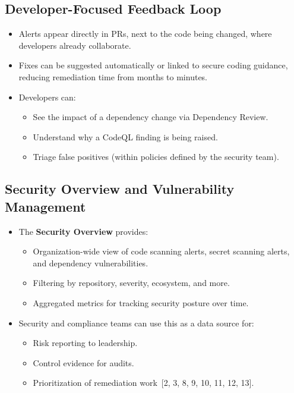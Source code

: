 \documentclass[11pt]{article}
\begin{document}
\subsection{Developer-Focused Feedback Loop}

\begin{itemize}[leftmargin=*]
  \item Alerts appear directly in PRs, next to the code being changed, where developers already collaborate.
  \item Fixes can be suggested automatically or linked to secure coding guidance, reducing remediation time from months to minutes.
  \item Developers can:
    \begin{itemize}
      \item See the impact of a dependency change via Dependency Review.
      \item Understand why a CodeQL finding is being raised.
      \item Triage false positives (within policies defined by the security team).
    \end{itemize}
\end{itemize}

\subsection{Security Overview and Vulnerability Management}

\begin{itemize}[leftmargin=*]
  \item The \textbf{Security Overview} provides:
    \begin{itemize}
      \item Organization-wide view of code scanning alerts, secret scanning alerts, and dependency vulnerabilities.
      \item Filtering by repository, severity, ecosystem, and more.
      \item Aggregated metrics for tracking security posture over time.
    \end{itemize}
  \item Security and compliance teams can use this as a data source for:
    \begin{itemize}
      \item Risk reporting to leadership.
      \item Control evidence for audits.
      \item Prioritization of remediation work~[2, 3, 8, 9, 10, 11, 12, 13].
    \end{itemize}
\end{itemize}
\end{document}
